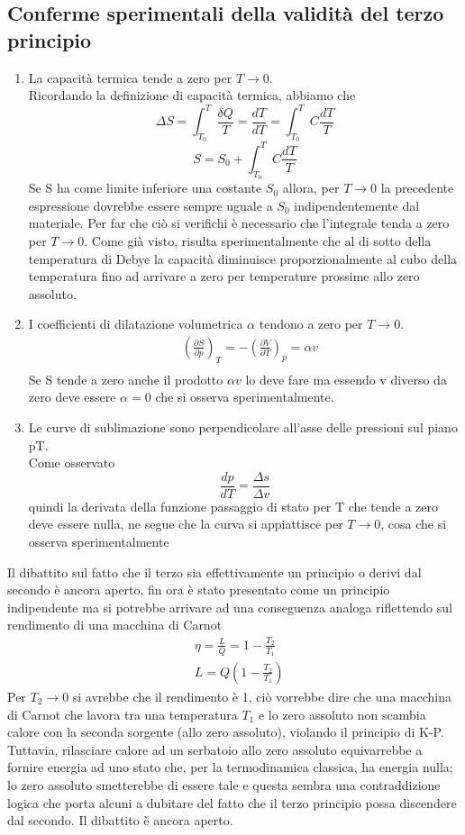 \documentclass[10pt,a4paper]{article}
\begin{document}
\subsection{Conferme sperimentali della validità del terzo principio}
\begin{enumerate}
	\item La capacità termica tende a zero per \(T \to 0\).\\
	 Ricordando la definizione di capacità termica, abbiamo che 
	 \[\Delta S = \int_{T_0}^{T}\frac{\delta Q}{T}=\frac{dT}{dT}= \int_{T_0}^{T}C\frac{dT}{T}\]
	 \[S = S_0 + \int_{T_0}^{T}C\frac{dT}{T}\]
	 Se S ha come limite inferiore una costante \(S_0\) allora, per \(T\to0\) la precedente espressione dovrebbe essere sempre uguale a \(S_0\) indipendentemente dal materiale. Per far che ciò si verifichi è necessario che l'integrale tenda a zero per \(T\to0\). Come già visto, risulta sperimentalmente che al di sotto della temperatura di Debye la capacità diminuisce proporzionalmente al cubo della temperatura fino ad arrivare a zero per temperature prossime allo zero assoluto.
	\item I coefficienti di dilatazione volumetrica $\alpha$ tendono a zero per \(T\to 0\).\\
	\begin{align*}
		&\left(\frac{\partial S}{\partial p}\right)_T = - \left(\frac{\partial V}{\partial T}\right)_p = \alpha v\\
	\end{align*}
	Se S tende a zero anche il prodotto \(\alpha v\) lo deve fare ma essendo v diverso da zero deve essere \(\alpha = 0\) che si osserva sperimentalmente. 
	\item Le curve di sublimazione sono perpendicolare all’asse delle pressioni sul piano pT.\\
	Come osservato \[\frac{dp}{dT} = \frac{\Delta s}{\Delta v}\] quindi la derivata della funzione passaggio di stato per T che tende a zero deve essere nulla, ne segue che la curva si appiattisce per \(T\to 0\), cosa che si osserva sperimentalmente
\end{enumerate}
Il dibattito sul fatto che il terzo sia effettivamente un principio o derivi dal secondo è ancora aperto, fin ora è stato presentato come un principio indipendente ma si potrebbe arrivare ad una conseguenza analoga riflettendo sul rendimento di una macchina di Carnot
\begin{align*}
	&\eta = \frac{L}{Q} = 1-\frac{T_2}{T_1}\\
	&L = Q\left(1-\frac{T_2}{T_1}\right)
\end{align*}
Per \(T_2\to 0\) si avrebbe che il rendimento è 1, ciò vorrebbe dire che una macchina di Carnot che lavora tra una temperatura \(T_1\) e lo zero assoluto non scambia calore con la seconda sorgente (allo zero assoluto), violando il principio di K-P. Tuttavia, rilasciare calore ad un serbatoio allo zero assoluto equivarrebbe a fornire energia ad uno stato che, per la termodinamica classica, ha energia nulla; lo zero assoluto smetterebbe di essere tale e questa sembra una contraddizione logica che porta alcuni a dubitare del fatto che il terzo principio possa discendere dal secondo. Il dibattito è ancora aperto.  
\end{document}
